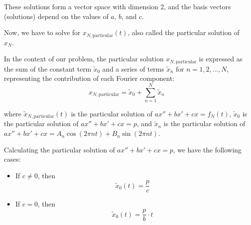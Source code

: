 \documentclass{article}
\begin{document}
These solutions form a vector space with dimension 2, and the basis vectors (solutions) depend on the values of \(a\), \(b\), and \(c\).

Now, we have to solve for \(x_{N,\text{particular}}(t)\), also called the particular solution of \(x_N\).

In the context of our problem, the particular solution \( x_{N,\text{particular}} \) is expressed as the sum of the constant term \( \tilde{x}_0 \) and a series of terms \( \tilde{x}_n \) for \( n = 1, 2, \ldots, N \), representing the contribution of each Fourier component:
\[ x_{N,\text{particular}} = \tilde{x}_0 + \sum_{n=1}^{N} \tilde{x}_n \]

where \( \widetilde{x}_{N,\text{particular}}(t) \) is the particular solution of \(ax'' + bx' + cx = f_N(t)\), \( \widetilde{x}_0 \) is the particular solution of \(ax''+bx'+cx = p\), and \( \widetilde{x}_n \) is the particular solution of \(ax''+bx'+cx = A_n \cos(2 \pi n t) + B_n \sin(2 \pi n t)\).

Calculating the particular solution of \(ax''+bx'+cx = p\), we have the following cases:
\begin{itemize}
    \item If \(c \neq 0\), then
    \[
        \widetilde{x}
        _{0}(t) = \frac{p}{c}
    \]
    \item If \(c = 0\), then
    \[
        \widetilde{x}
        _{0}(t) = \frac{p}{b} \cdot t
    \]
\end{itemize}
\end{document}
